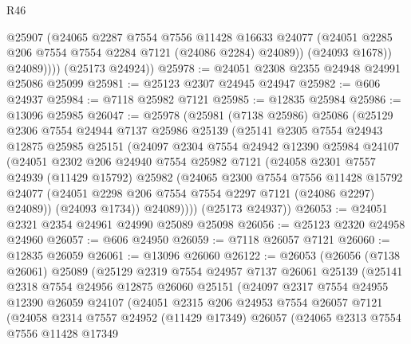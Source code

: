 \begin{lexlean}{R46}
\begin{coremodule}
                @25907
                (@24065
                  @2287
                  @7554
                  @7556
                  @11428
                  @16633
                  @24077
                  (@24051 @2285 @206 @7554 @7554 @2284 @7121 (@24086 @2284) @24089))
                (@24093 @1678))
              @24089))))
      (@25173 @24924))
@25978 := @24051 @2308 @2355 @24948 @24991 @25086 @25099
@25981 := @25123 @2307 @24945 @24947
@25982 := @606 @24937
@25984 := @7118 @25982 @7121
@25985 := @12835 @25984
@25986 := @13096 @25985
@26047 := @25978
    (@25981
      (@7138 @25986)
      @25086
      (@25129
        @2306
        @7554
        @24944
        @7137
        @25986
        @25139
        (@25141
          @2305
          @7554
          @24943
          @12875
          @25985
          @25151
          (@24097
            @2304
            @7554
            @24942
            @12390
            @25984
            @24107
            (@24051
              @2302
              @206
              @24940
              @7554
              @25982
              @7121
              (@24058
                @2301
                @7557
                @24939
                (@11429 @15792)
                @25982
                (@24065
                  @2300
                  @7554
                  @7556
                  @11428
                  @15792
                  @24077
                  (@24051 @2298 @206 @7554 @7554 @2297 @7121 (@24086 @2297) @24089))
                (@24093 @1734))
              @24089))))
      (@25173 @24937))
@26053 := @24051 @2321 @2354 @24961 @24990 @25089 @25098
@26056 := @25123 @2320 @24958 @24960
@26057 := @606 @24950
@26059 := @7118 @26057 @7121
@26060 := @12835 @26059
@26061 := @13096 @26060
@26122 := @26053
    (@26056
      (@7138 @26061)
      @25089
      (@25129
        @2319
        @7554
        @24957
        @7137
        @26061
        @25139
        (@25141
          @2318
          @7554
          @24956
          @12875
          @26060
          @25151
          (@24097
            @2317
            @7554
            @24955
            @12390
            @26059
            @24107
            (@24051
              @2315
              @206
              @24953
              @7554
              @26057
              @7121
              (@24058
                @2314
                @7557
                @24952
                (@11429 @17349)
                @26057
                (@24065
                  @2313
                  @7554
                  @7556
                  @11428
                  @17349

\end{coremodule}
\end{lexlean}
